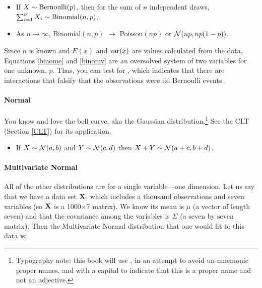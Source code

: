 \begin{itemize}
\item If $X \sim {\rm Bernoulli}(p)$, then for the sum of $n$ independent draws,
$\sum_{i=1}^n X_i \sim {\rm Binomial}(n,p)$.
\item As $n\to\infty$, Binomial$(n,p)$ $\to$ Poisson$(np)$ or ${\cal
N}(np, np(1-p))$.
\end{itemize}

Since $n$ is known and $E(x)$ and $\operatorname{var}(x)$ are values calculated from
the data, Equations \ref{binome} and \ref{binomv} are an oversolved
system of two variables for one unknown, $p$. Thus, you can test for
, which indicates that there are interactions that
falsify that the observations were iid Bernoulli events.

\paragraph{Normal}

You know and love the bell curve, aka the Gaussian
distribution.\footnote{Typography note: this book will use ,
in an attempt to avoid un-mnemonic proper names, and with a capital to indicate
that this is a proper name and not an adjective.} See the CLT (Section
\ref{CLT}) for its application.


\begin{itemize}
\item If $X \sim {\cal N} (a,b)$ and $Y \sim {\cal N} (c,d)$ then $X+Y \sim {\cal N}
(a+c,b+d)$.
\end{itemize}

\paragraph{Multivariate Normal}
All of the other distributions are for a single variable---one
dimension. Let us say that we have a data set ${\bf X}$, which includes a
thousand observations and seven variables (so ${\bf X}$ is a 1000$\times$7
matrix). We know its mean is
$\mu$ (a vector of length seven) and that the covariance among the
variables is $\Sigma$ (a seven by seven matrix). Then the Multivariate
Normal distribution that one would fit to this data is:

